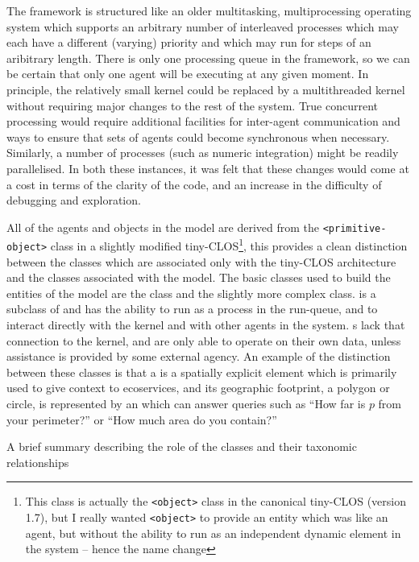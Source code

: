 The framework is structured like an older multitasking,
multiprocessing operating system which supports an arbitrary number of
interleaved processes which may each have a different (varying)
priority and which may run for steps of an aribitrary length. There is
only one processing queue in the framework, so we can be certain that
only one agent will be executing at any given moment.  In principle,
the relatively small kernel could be replaced by a multithreaded
kernel without requiring major changes to the rest of the system. True
concurrent processing would require additional facilities for
inter-agent communication and ways to ensure that sets of agents could
become synchronous when necessary. Similarly, a number of processes
(such as numeric integration) might be readily parallelised.  In both
these instances, it was felt that these changes would come at a cost
in terms of the clarity of the code, and an increase in the difficulty
of debugging and exploration.

All of the agents and objects in the model are derived
from the \texttt{<primitive-object>} class in a slightly modified
tiny-CLOS\footnote{This class is actually the \texttt{<object>} class in
  the canonical tiny-CLOS (version 1.7), but I really wanted
  \texttt{<object>} to provide an entity which was like an agent, but
  without the ability to run as an independent dynamic element in the
  system -- hence the name change}, this provides a clean distinction
between the classes which are associated only with the tiny-CLOS
architecture and the classes associated with the model.  The basic
classes used to build the entities of the model are the
 class and the slightly more complex 
class.  is a subclass of  and has the ability to
run as a process in the run-queue, and to interact directly with the
kernel and with other agents in the system.  s lack that
connection to the kernel, and are only able to operate on their own
data, unless assistance is provided by some external agency.  An
example of the distinction between these classes is that a 
is a spatially explicit  element which is primarily used to
give context to ecoservices, and its geographic footprint, a polygon
or circle, is represented by an  which can answer queries
such as ``How far is $p$ from your perimeter?'' or ``How much area do
you contain?'' 

A brief summary describing the role of the classes and their taxonomic
relationships 

